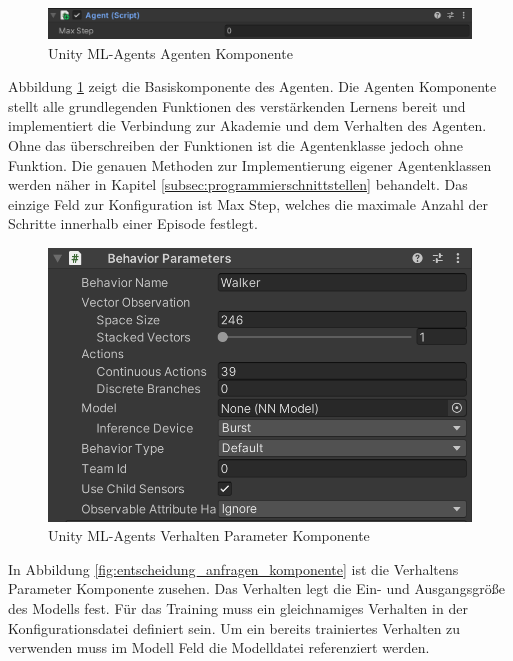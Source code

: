 \begin{figure}[H]
  \centering
  \includegraphics[scale=0.5]{img/agent_komponente}
  \caption{Unity ML-Agents Agenten Komponente}
  \label{fig:agent_komponente}
\end{figure}

Abbildung \ref{fig:agent_komponente} zeigt die Basiskomponente des Agenten. Die Agenten Komponente stellt alle grundlegenden Funktionen des verstärkenden Lernens bereit und implementiert die Verbindung zur Akademie und dem Verhalten des Agenten. Ohne das überschreiben der Funktionen ist die Agentenklasse jedoch ohne Funktion. Die genauen Methoden zur Implementierung eigener Agentenklassen werden näher in Kapitel \ref{subsec:programmierschnittstellen} behandelt. Das einzige Feld zur Konfiguration ist Max Step, welches die maximale Anzahl der Schritte innerhalb einer Episode festlegt.

\begin{figure}[H]
  \centering  
  \includegraphics[scale=0.5]{img/verhalten_komponente.png}
  \caption{Unity ML-Agents Verhalten Parameter Komponente}
  \label{fig:verhalten_komponente}
\end{figure}

In Abbildung \ref{fig:entscheidung_anfragen_komponente} ist die Verhaltens Parameter Komponente zusehen. Das Verhalten legt die Ein- und Ausgangsgröße des Modells fest. Für das Training muss ein gleichnamiges Verhalten in der Konfigurationsdatei definiert sein. Um ein bereits trainiertes Verhalten zu verwenden muss im Modell Feld die Modelldatei referenziert werden.

